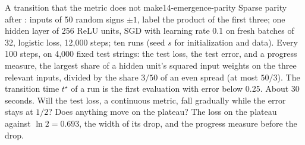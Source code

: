 \begin{refsection}
\begin{lab}{A transition that the metric does not make}{14-emergence-parity}\label{lab:emergence:parity}
 Sparse parity after \textcite{BarakEtAl2022}: inputs of 50 random signs $\pm1$, label the product of the first three; one hidden layer of 256 ReLU units, SGD with learning rate 0.1 on fresh batches of 32, logistic loss, 12,000 steps; ten runs (seed $s$ for initialization and data). Every 100 steps, on 4,000 fixed test strings: the test loss, the test error, and a progress measure, the largest share of a hidden unit's squared input weights on the three relevant inputs, divided by the share $3/50$ of an even spread (at most $50/3$). The transition time $t^\star$ of a run is the first evaluation with error below 0.25. About 30 seconds.
 Will the test loss, a continuous metric, fall gradually while the error stays at $1/2$? Does anything move on the plateau?
 The loss on the plateau against $\ln2=0.693$, the width of its drop, and the progress measure before the drop.
\end{lab}


\end{refsection}
